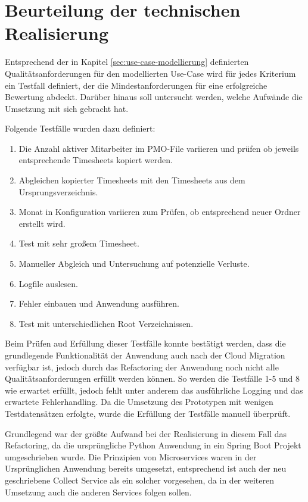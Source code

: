 \section{Beurteilung der technischen Realisierung}
Entsprechend der in Kapitel \ref{sec:use-case-modellierung} definierten Qualitätsanforderungen für den modellierten Use-Case wird für jedes Kriterium ein Testfall definiert, der die Mindestanforderungen für eine erfolgreiche Bewertung abdeckt. Darüber hinaus soll untersucht werden, welche Aufwände die Umsetzung mit sich gebracht hat.

Folgende Testfälle wurden dazu definiert:
\begin{enumerate}
    \item Die Anzahl aktiver Mitarbeiter im PMO-File variieren und prüfen ob jeweils entsprechende Timesheets kopiert werden.
    \item Abgleichen kopierter Timesheets mit den Timesheets aus dem Ursprungsverzeichnis.
    \item Monat in Konfiguration variieren zum Prüfen, ob entsprechend neuer Ordner erstellt wird.
    \item Test mit sehr großem Timesheet.
    \item Manueller Abgleich und Untersuchung auf potenzielle Verluste.
    \item Logfile auslesen.
    \item Fehler einbauen und Anwendung ausführen.
    \item Test mit unterschiedlichen Root Verzeichnissen.
\end{enumerate}

Beim Prüfen aud Erfüllung dieser Testfälle konnte bestätigt werden, dass die grundlegende Funktionalität der Anwendung auch nach der Cloud Migration verfügbar ist, jedoch durch das Refactoring der Anwendung noch nicht alle Qualitätsanforderungen erfüllt werden können. So werden die Testfälle 1-5 und 8 wie erwartet erfüllt, jedoch fehlt unter anderem das ausführliche Logging und das erwartete Fehlerhandling. Da  die Umsetzung des Prototypen mit wenigen Testdatensätzen erfolgte, wurde die Erfüllung der Testfälle manuell überprüft.

Grundlegend war der größte Aufwand bei der Realisierung in diesem Fall das Refactoring, da die ursprüngliche Python Anwendung in ein Spring Boot Projekt umgeschrieben wurde. Die Prinzipien von Microservices waren in der Ursprünglichen Anwendung bereits umgesetzt, entsprechend ist auch der neu geschriebene Collect Service als ein solcher vorgesehen, da in der weiteren Umsetzung auch die anderen Services folgen sollen. \pagebreak